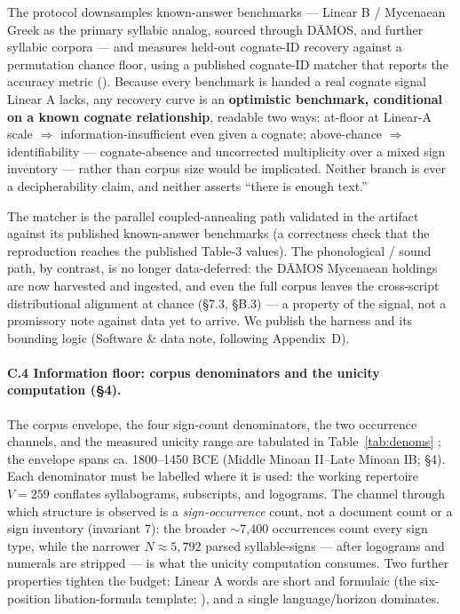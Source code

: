 The protocol downsamples known-answer benchmarks --- Linear B / Mycenaean
Greek as the primary syllabic analog, sourced through D\=AMOS, and further
syllabic corpora --- and measures held-out cognate-ID recovery against a
permutation chance floor, using a published cognate-ID matcher
\citep{tamburini2025} that reports the \citet{luo2019} accuracy metric
(\artref).
Because every benchmark is handed a real cognate signal Linear A lacks, any
recovery curve is an \textbf{optimistic benchmark, conditional on a known
cognate relationship}, readable
two ways: at-floor at Linear-A scale $\Rightarrow$ information-insufficient
even given a cognate; above-chance $\Rightarrow$ identifiability ---
cognate-absence and uncorrected multiplicity over a mixed sign inventory ---
rather than corpus size would be implicated. Neither branch is ever a
decipherability claim, and neither asserts ``there is enough text.''

The matcher is the parallel coupled-annealing path validated in the artifact
against its published known-answer benchmarks (a correctness check that the
reproduction reaches the published Table-3 values). The phonological /
sound path, by contrast, is no longer data-deferred: the D\=AMOS Mycenaean
holdings are now harvested and ingested, and even the full corpus leaves
the cross-script distributional alignment at chance (\S7.3, \S B.3) --- a
property of the signal, not a promissory note against data yet to arrive. We
publish the harness and its bounding logic (Software \& data note,
following Appendix~D).

\paragraph{C.4 Information floor: corpus denominators and the unicity
computation (\S4).} The corpus envelope, the four
sign-count denominators, the two occurrence channels, and the measured
unicity range are tabulated in Table~\ref{tab:denoms}
\citep[Schoep 2002;][\S1--3, \S6]{salgarella2025}; the envelope spans ca.
1800--1450 BCE (Middle Minoan II--Late Minoan IB; \S4). Each denominator
must be labelled where it is used: the working repertoire $V = 259$
conflates syllabograms, subscripts, and logograms. The channel through
which structure is observed is a \emph{sign-occurrence} count, not a
document count or a sign inventory (invariant 7): the broader $\sim$7,400
occurrences count every sign type, while the narrower
$N \approx 5{,}792$ parsed syllable-signs --- after logograms and
numerals are stripped --- is what the unicity computation consumes. Two
further properties tighten the budget: Linear A words are short and
formulaic (the six-position libation-formula template;
\citealp[\S7]{salgarella2025}), and a single language/horizon dominates.

